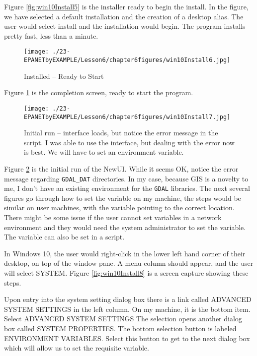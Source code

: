 Figure \ref{fig:win10Install5} is the installer ready to begin the install.  In the figure, we have selected a default installation and the creation of a desktop alias.  The user would select install and the installation would begin.   The program installs pretty fast, less than a minute.

\begin{figure}[h!] %
   \centering
   \texttt{[image: ./23-EPANETbyEXAMPLE/Lesson6/chapter6figures/win10Install6.jpg]} 
   \caption{Installed -- Ready to Start}
   \label{fig:win10Install6}
\end{figure}
Figure \ref{fig:win10Install6} is the completion screen, ready to start the program.
\clearpage
\begin{figure}[h!] %
   \centering
   \texttt{[image: ./23-EPANETbyEXAMPLE/Lesson6/chapter6figures/win10Install7.jpg]} 
   \caption{Initial run -- interface loads, but notice the error message in the script.  I was able to use the interface, but dealing with the error now is best.  We will have to set an environment variable.}
   \label{fig:win10Install7}
\end{figure}

Figure \ref{fig:win10Install7} is the initial run of the NewUI.  While it seems OK, notice the error message regarding \texttt{GDAL\_DAT} directories.  In my case, because GIS is a novelty to me, I don't have an existing environment for the \texttt{GDAL} libraries.  The next several figures go through how to set the variable on my machine, the steps would be similar on user machines, with the variable pointing to the correct location.  There might be some issue if the user cannot set variables in a network environment and they would need the system administrator to set the variable.
The variable can also be set in a script.

In Windows 10, the user would right-click in the lower left hand corner of their desktop, on top of the window pane.
A menu column should appear, and the user will select SYSTEM.
Figure \ref{fig:win10Install8} is a screen capture showing these steps.

Upon entry into the system setting dialog box there is a link called ADVANCED SYSTEM SETTINGS in the left column. 
On my machine, it is the bottom item.
Select ADVANCED SYSTEM SETTINGS
The selection opens another dialog box called SYSTEM PROPERTIES.  
The bottom selection button is labeled ENVIRONMENT VARIABLES.
Select this button to get to the next dialog box which will allow us to set the requisite variable.

